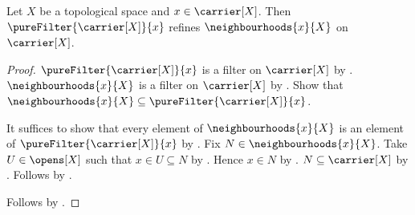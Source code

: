 \begin{proposition}\label{pure_filter_refines_neighbourhood_filter}
    Let $X$ be a topological space and $x\in\carrier[X]$.
    Then $\pureFilter{\carrier[X]}{x}$ refines
        $\neighbourhoods{x}{X}$ on $\carrier[X]$.
\end{proposition}
\begin{proof}
    $\pureFilter{\carrier[X]}{x}$ is a filter on $\carrier[X]$ by
        .
    $\neighbourhoods{x}{X}$ is a filter on $\carrier[X]$ by
        .
    Show that $\neighbourhoods{x}{X}
        \subseteq\pureFilter{\carrier[X]}{x}$.
    \begin{subproof}
        It suffices to show that every element of $\neighbourhoods{x}{X}$
            is an element of $\pureFilter{\carrier[X]}{x}$ by
            .
        Fix $N\in\neighbourhoods{x}{X}$.
        Take $U\in\opens[X]$ such that $x\in U\subseteq N$ by
            .
        Hence $x\in N$ by .
        $N\subseteq\carrier[X]$ by
            .
        Follows by .
    \end{subproof}
    Follows by .
\end{proof}

